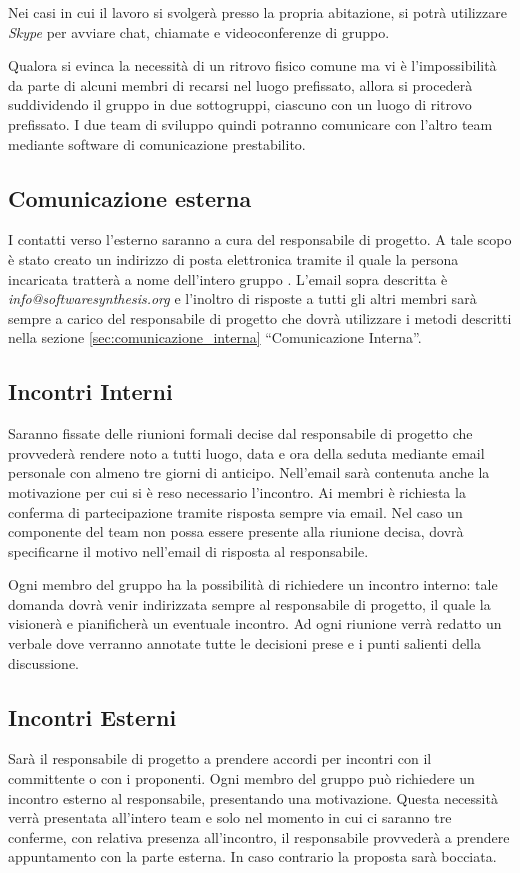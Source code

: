 Nei casi in cui il lavoro si svolgerà presso la propria abitazione, si potrà utilizzare \textit{Skype} per avviare chat, chiamate e videoconferenze di gruppo.

Qualora si evinca la necessità di un ritrovo fisico comune ma vi è l'impossibilità da parte di alcuni membri di recarsi nel luogo prefissato, allora si procederà suddividendo il gruppo in due sottogruppi, ciascuno con un luogo di ritrovo prefissato. I due team di sviluppo quindi potranno comunicare con l'altro team mediante software di comunicazione prestabilito.


\subsection{Comunicazione esterna}
I contatti verso l'esterno saranno a cura del responsabile di progetto. A tale scopo è stato creato un indirizzo di posta elettronica tramite il quale la persona incaricata tratterà a nome dell'intero gruppo \team{}. L'email sopra descritta è \textit{info@softwaresynthesis.org} e l'inoltro di risposte a tutti gli altri membri sarà sempre a carico del responsabile di progetto che dovrà utilizzare i metodi descritti nella sezione \ref{sec:comunicazione_interna} ``Comunicazione Interna''.

\subsection{Incontri Interni}
Saranno fissate delle riunioni formali decise dal responsabile di progetto che provvederà rendere noto a tutti luogo, data e ora della seduta mediante email personale con almeno tre giorni di anticipo. Nell'email sarà contenuta anche la motivazione per cui si è reso necessario l'incontro. Ai membri è richiesta la conferma di partecipazione tramite risposta sempre via email. Nel caso un componente del team non possa essere presente alla riunione decisa, dovrà specificarne il motivo nell'email di risposta al responsabile.

Ogni membro del gruppo ha la possibilità di richiedere un incontro interno: tale domanda dovrà venir indirizzata sempre al responsabile di progetto, il quale la visionerà e pianificherà un eventuale incontro.
Ad ogni riunione verrà redatto un verbale dove verranno annotate tutte le decisioni prese e i punti salienti della discussione.

\subsection{Incontri Esterni}
Sarà il responsabile di progetto a prendere accordi per incontri con il committente o con i proponenti.
Ogni membro del gruppo può richiedere un incontro esterno al responsabile, presentando una motivazione. Questa necessità verrà presentata all'intero team e solo nel momento in cui ci saranno tre conferme, con relativa presenza all'incontro, il responsabile provvederà a prendere appuntamento con la parte esterna. In caso contrario la proposta sarà bocciata.

